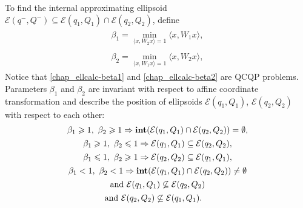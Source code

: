 \documentclass[letterpaper,10pt,english]{sphinxmanual}
\begin{document}
To find the internal approximating ellipsoid
${\mathcal E}(q^-,Q^-)\subseteq{\mathcal E}(q_1,Q_1)\cap{\mathcal E}(q_2,Q_2)$,
define
\label{chap_ellcalc:equation-beta1}\begin{gather}
\begin{split}\beta_1 = \min_{\langle x,W_2x\rangle=1}\langle x,W_1x\rangle,\end{split}\label{chap_ellcalc-beta1}
\end{gather}\label{chap_ellcalc:equation-beta2}\begin{gather}
\begin{split}\beta_2 = \min_{\langle x,W_1x\rangle=1}\langle x,W_2x\rangle,\end{split}\label{chap_ellcalc-beta2}
\end{gather}
Notice that \eqref{chap_ellcalc-beta1} and \eqref{chap_ellcalc-beta2} are QCQP problems. Parameters
$\beta_1$ and $\beta_2$ are invariant with respect to affine
coordinate transformation and describe the position of ellipsoids
${\mathcal E}(q_1,Q_1)$, ${\mathcal E}(q_2,Q_2)$ with
respect to each other:
\begin{gather}
\begin{split}\beta_1\geqslant1,~\beta_2\geqslant1 & \Rightarrow
{\bf int}({\mathcal E}(q_1,Q_1)\cap{\mathcal E}(q_2,Q_2))=\emptyset, \\\end{split}\notag\\\begin{split}\beta_1\geqslant1,~\beta_2\leqslant1 & \Rightarrow {\mathcal E}(q_1,Q_1)\subseteq{\mathcal E}(q_2,Q_2), \\\end{split}\notag\\\begin{split}\beta_1\leqslant1,~\beta_2\geqslant1 & \Rightarrow {\mathcal E}(q_2,Q_2)\subseteq{\mathcal E}(q_1,Q_1), \\\end{split}\notag\\\begin{split}\beta_1<1,~\beta_2<1 & \Rightarrow
{\bf int}({\mathcal E}(q_1,Q_1)\cap{\mathcal E}(q_2,Q_2))\neq\emptyset \\\end{split}\notag\\\begin{split}&\mbox{and} ~ {\mathcal E}(q_1,Q_1)\not\subseteq{\mathcal E}(q_2,Q_2) \\\end{split}\notag\\\begin{split}&\mbox{and} ~ {\mathcal E}(q_2,Q_2)\not\subseteq{\mathcal E}(q_1,Q_1).\end{split}\notag
\end{gather}
\end{document}
